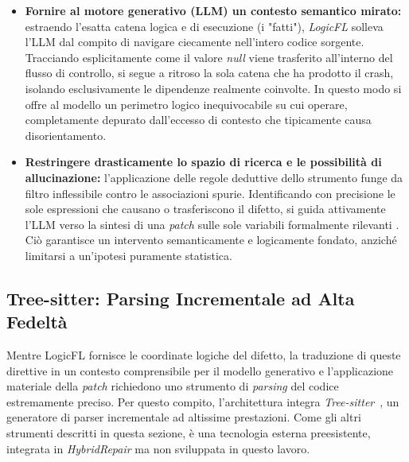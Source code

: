 \begin{itemize}
    \item \textbf{Fornire al motore generativo (LLM) un contesto semantico mirato:} estraendo l'esatta catena
    logica e di esecuzione (i "fatti"), \textit{LogicFL} solleva l'LLM dal compito di navigare ciecamente nell'intero codice sorgente.
    Tracciando esplicitamente come il valore \textit{null} viene trasferito all'interno del flusso di controllo, 
    si segue a ritroso la sola catena che ha prodotto il crash, isolando esclusivamente le dipendenze realmente coinvolte.  
    In questo modo si offre al modello un perimetro logico inequivocabile su cui operare, completamente depurato 
    dall'eccesso di contesto che tipicamente causa disorientamento.

    \item \textbf{Restringere drasticamente lo spazio di ricerca e le possibilità di allucinazione:} l'applicazione delle
    regole deduttive dello strumento funge da filtro inflessibile contro le associazioni spurie. Identificando con precisione
    le sole espressioni che causano o trasferiscono il difetto, si guida attivamente l'LLM verso la sintesi di una \textit{patch}
    sulle sole variabili formalmente rilevanti \cite{kim2024identifying}. Ciò garantisce un intervento semanticamente e
    logicamente fondato, anziché limitarsi a un'ipotesi puramente statistica.
\end{itemize}

\subsection{Tree-sitter: Parsing Incrementale ad Alta Fedeltà}
Mentre LogicFL fornisce le coordinate logiche del difetto, la traduzione di queste direttive in un contesto 
comprensibile per il modello generativo e l'applicazione materiale della \textit{patch} richiedono uno strumento 
di \textit{parsing} del codice estremamente preciso. Per questo compito, l'architettura integra \textit{Tree-sitter}~\cite{brunsfeld_treesitter},
un generatore di parser incrementale ad altissime prestazioni. Come gli altri strumenti descritti
in questa sezione, è una tecnologia esterna preesistente, integrata in \textit{HybridRepair} ma
non sviluppata in questo lavoro.

